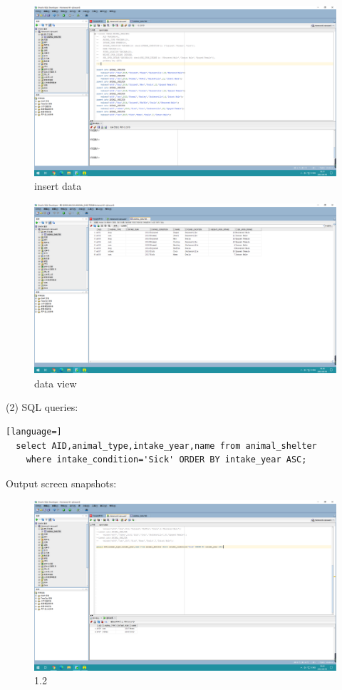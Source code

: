 \documentclass[]{article}
\begin{document}
	\begin{figure}[H]
		\centering
		\includegraphics[width=1.0\linewidth]{./document-H1/exercise1/1.1-3}
		\caption{insert data}
		\label{1.1-3}
	\end{figure}
	\begin{figure}[H]
		\centering
		\includegraphics[width=0.95\linewidth]{./document-H1/exercise1/1.1-4}
		\caption{data view}
		\label{1.1-4}
	\end{figure}


(2) SQL queries:
	\begin{lstlisting}[language=] 
  select AID,animal_type,intake_year,name from animal_shelter 
	where intake_condition='Sick' ORDER BY intake_year ASC;
	\end{lstlisting} 
	Output screen snapshots:
	\begin{figure}[H]
		\centering
		\includegraphics[width=0.95\linewidth]{./document-H1/exercise1/1.2}
		\caption{1.2}
		\label{1.2}
	\end{figure}
\end{document}
